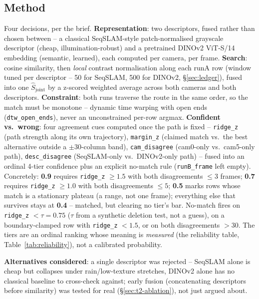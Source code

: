 \documentclass[11pt,a4paper]{article}
\begin{document}
\subsection{Method}

Four decisions, per the brief. \textbf{Representation}: two descriptors, fused rather than chosen
between -- a classical SeqSLAM-style patch-normalised grayscale descriptor (cheap,
illumination-robust) and a pretrained DINOv2 ViT-S/14 embedding (semantic, learned), each computed
per camera, per frame. \textbf{Search}: cosine similarity, then \emph{local} contrast
normalisation along each runA row (window tuned per descriptor -- 50 for SeqSLAM, 500 for DINOv2,
\S\ref{sec:ledger}), fused into one $\hat S_{\mathrm{joint}}$ by a z-scored weighted average across
both cameras and both descriptors. \textbf{Constraint}: both runs traverse the route in the same
order, so the match must be monotone -- dynamic time warping with open ends
(\texttt{dtw\_open\_ends}), never an unconstrained per-row argmax. \textbf{Confident vs.\ wrong}:
four agreement cues computed once the path is fixed -- \texttt{ridge\_z} (path strength along its
own trajectory), \texttt{margin\_z} (claimed match vs.\ the best alternative outside a
$\pm 30$-column band), \texttt{cam\_disagree} (cam0-only vs.\ cam5-only path),
\texttt{desc\_disagree} (SeqSLAM-only vs.\ DINOv2-only path) -- fused into an ordinal 4-tier
confidence plus an explicit no-match rule (\texttt{runB\_frame} left empty). Concretely:
\textbf{0.9} requires \texttt{ridge\_z} $\geq 1.5$ with both disagreements $\leq 3$ frames;
\textbf{0.7} requires \texttt{ridge\_z} $\geq 1.0$ with both disagreements $\leq 5$; \textbf{0.5}
marks rows whose match is a stationary plateau (a range, not one frame); everything else that
survives stays at \textbf{0.4} -- matched, but clearing no tier's bar. No-match fires on
\texttt{ridge\_z} $< \tau = 0.75$ ($\tau$ from a synthetic deletion test, not a guess), on a
boundary-clamped row with \texttt{ridge\_z} $< 1.5$, or on both disagreements $> 30$. The tiers
are an ordinal ranking whose meaning is \emph{measured} (the reliability table,
Table~\ref{tab:reliability}), not a calibrated probability.

\textbf{Alternatives considered}: a single descriptor was
rejected -- SeqSLAM alone is cheap but collapses under rain/low-texture stretches, DINOv2 alone
has no classical baseline to cross-check against; early fusion (concatenating descriptors before
similarity) was tested for real (\S\ref{sec:t2-ablation}), not just argued about.
\end{document}
